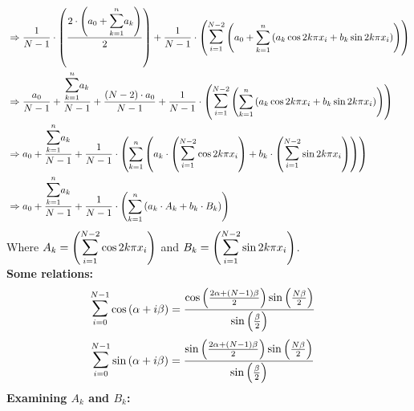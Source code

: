 \documentclass[letterpaper]{exam}
\begin{document}
\begin{questions}
\begin{solution}
\begin{align*}
    &\Rightarrow \frac{1}{N-1}\cdot \left( \frac{2 \cdot \left(a_0 + \overset{n}{\underset{k = 1}{\mathlarger{\mathlarger{\sum}}}} a_k\right)}{2}\right) + \frac{1}{N-1} \cdot \left( \overset{N-2}{\underset{i = 1}{\mathlarger{\mathlarger{\sum}}}} \left( a_0 + \overset{n}{\underset{k=1}{\sum}}\left(a_k \cos{2k\pi x_i} + b_k \sin{2k \pi x_i}\right)\right)\right)\\
    &\Rightarrow
    \frac{a_0}{N-1}+\frac{\overset{n}{\underset{k = 1}{\mathlarger{\mathlarger{\sum}}}} a_k}{N-1} + \frac{(N-2)\cdot a_0}{N-1} + \frac{1}{N-1} \cdot \left( \overset{N-2}{\underset{i = 1}{\mathlarger{\mathlarger{\sum}}}} \left( \overset{n}{\underset{k=1}{\sum}}\left(a_k \cos{2k\pi x_i} + b_k \sin{2k \pi x_i}\right)\right)\right)\\
    &\Rightarrow
    a_0 + \frac{\overset{n}{\underset{k = 1}{\mathlarger{\mathlarger{\sum}}}} a_k}{N-1} + \frac{1}{N-1} \cdot \left( \overset{n}{\underset{k=1}{\sum}}\left(a_k \cdot \left( \overset{N-2}{\underset{i = 1}{\mathlarger{\mathlarger{\sum}}}}\cos{2k\pi x_i}\right) + b_k \cdot \left( \overset{N-2}{\underset{i = 1}{\mathlarger{\mathlarger{\sum}}}}\sin{2k \pi x_i}\right) \right)\right)\\
    &\Rightarrow
    a_0 +  \frac{\overset{n}{\underset{k = 1}{\mathlarger{\mathlarger{\sum}}}} a_k}{N-1} + \frac{1}{N-1} \cdot \left(\overset{n}{\underset{k=1}{\sum}}\left(a_k \cdot A_k + b_k \cdot B_k \right)\right)
\end{align*}
Where $A_k = \left( \overset{N-2}{\underset{i = 1}{\mathlarger{\mathlarger{\sum}}}}\cos{2k\pi x_i}\right) $ and $B_k = \left( \overset{N-2}{\underset{i = 1}{\mathlarger{\mathlarger{\sum}}}}\sin{2k \pi x_i}\right)$.\\
\textbf{Some relations:}\\
\begin{align}
\label{1}
     \overset{N-1}{\underset{i = 0}{\mathlarger{\mathlarger{\sum}}}}\cos{\left(\alpha + i\beta\right)} &= \frac{\cos{\left(\frac{2\alpha + (N-1)\beta}{2}\right)}\sin{\left(\frac{N\beta}{2}\right)}}{\sin{\left(\frac{\beta}{2}\right)}}  
\end{align}
\begin{align}
    \label{2}
     \overset{N-1}{\underset{i = 0}{\mathlarger{\mathlarger{\sum}}}}\sin{\left(\alpha + i\beta\right)} &= \frac{\sin{\left(\frac{2\alpha + (N-1)\beta}{2}\right)}\sin{\left(\frac{N\beta}{2}\right)}}{\sin{\left(\frac{\beta}{2}\right)}}
\end{align}
\newpage
\textbf{Examining $A_k$ and $B_k$:}\\

\end{solution}
\end{questions}
\end{document}
